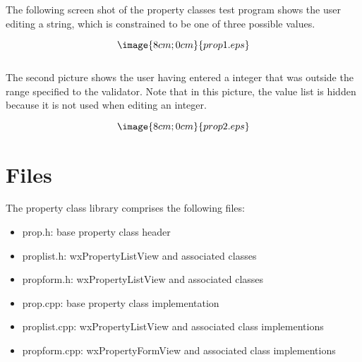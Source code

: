 The following screen shot of the property classes test program shows the
user editing a string, which is constrained to be one of three possible
values.

$$\image{8cm;0cm}{prop1.eps}$$\\

The second picture shows the user having entered a integer that
was outside the range specified to the validator. Note that in this picture,
the value list is hidden because it is not used when editing an integer.

$$\image{8cm;0cm}{prop2.eps}$$

\chapter{Files}\label{files}
%
\setfooter{\thepage}{}{}{}{}{\thepage}%

The property class library comprises the following files:

\begin{itemize}\itemsep=0pt
\item prop.h: base property class header
\item proplist.h: wxPropertyListView and associated classes
\item propform.h: wxPropertyListView and associated classes
\item prop.cpp: base property class implementation
\item proplist.cpp: wxPropertyListView and associated class implementions
\item propform.cpp: wxPropertyFormView and associated class implementions
\end{itemize}
